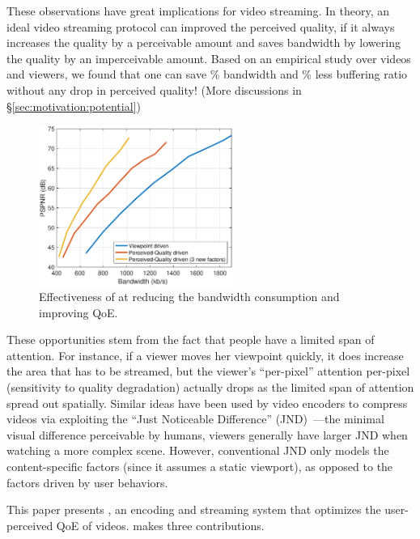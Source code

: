 These observations 
have great implications for \vr video streaming. 
In theory, an ideal video streaming protocol can improved the perceived quality, if it always increases the quality by a perceivable amount and saves bandwidth by lowering the quality by an imperceivable amount. 
Based on an empirical study over \fillme videos and \fillme viewers, we found that one can save \fillme\% bandwidth and \fillme\% less buffering ratio without any drop in perceived quality! (More discussions in \S\ref{sec:motivation:potential})



\begin{figure}[t!]
  \centering
  \includegraphics[width=2.5in]{images/improvement.eps}
  \caption{Effectiveness of \name at reducing the bandwidth consumption and improving QoE. }
  \label{fig:intro-improvement}
  \end{figure}

These opportunities stem from the fact that people have a limited span of attention.
For instance, if a viewer moves her viewpoint quickly, it does increase the area that has to be streamed, but the viewer's ``per-pixel'' attention per-pixel (\ie sensitivity to quality degradation) actually drops as the limited span of attention spread out spatially.
Similar ideas have been used by video encoders to compress videos via exploiting the ``Just Noticeable Difference'' (JND)~\cite{??,??,??}---the minimal visual difference perceivable by humans, \eg viewers generally have larger JND when watching a more complex scene. 
However, conventional JND only models the content-specific factors (since it assumes a static viewport), as opposed to the factors driven by user behaviors. 

This paper presents {\em \name}, an encoding and streaming system that optimizes the user-perceived QoE of \vr videos.
\name makes three contributions.

